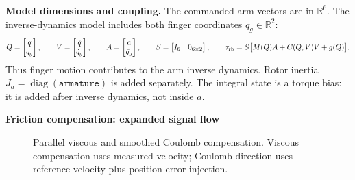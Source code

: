 \documentclass[11pt,a4paper]{report}
\newcommand{\diag}{\operatorname{diag}}
\begin{document}
\begin{landscape}
\vspace{-2mm}
\textbf{Model dimensions and coupling.}
The commanded arm vectors are in $\mathbb R^6$. The inverse-dynamics model
includes both finger coordinates $q_g\in\mathbb R^2$:
\[
 Q=\begin{bmatrix}q\\q_g\end{bmatrix},\qquad
 V=\begin{bmatrix}\dot q\\\dot q_g\end{bmatrix},\qquad
 A=\begin{bmatrix}a\\\ddot q_g\end{bmatrix},\qquad
 S=\begin{bmatrix}I_6&0_{6\times2}\end{bmatrix},\qquad
 \tau_{\rm rb}=S\bigl[M(Q)A+C(Q,V)V+g(Q)\bigr].
\]
Thus finger motion contributes to the arm inverse dynamics. Rotor inertia
$J_a=\diag(\texttt{armature})$ is added separately. The integral state is a
torque bias: it is added after inverse dynamics, not inside $a$.

\clearpage
\begin{center}
  {\Large\bfseries Friction compensation: expanded signal flow}
\end{center}

\begin{figure}[ht]
\centering
{}
\caption{Parallel viscous and smoothed Coulomb compensation. Viscous
compensation uses measured velocity; Coulomb direction uses reference
velocity plus position-error injection.}
\label{fig:friction}
\end{figure}


\end{landscape}
\end{document}

